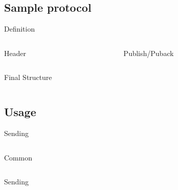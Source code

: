\documentclass{beamer}
\begin{document}
\subsection{Sample protocol}

\begin{frame}{Definition}

  \begin{columns}
      \begin{column}{0.5\textwidth}
        \begin{block}{Header}
          
        \end{block}        
      \end{column}
      \pause
      \begin{column}{0.5\textwidth}
        \begin{block}{Publish/Puback}
          
        \end{block}
      \end{column}
  \end{columns}
  \pause
  \begin{columns}
      \begin{column}{0.3333\textwidth}
        \begin{block}{Final Structure}
          
        \end{block}
      \end{column}
  \end{columns}
\end{frame}

\subsection{Usage}

\begin{frame}{Sending}
    {
      \begin{columns}
         \begin{column}{1.0\textwidth}
               \begin{block}{Common}
                  
               \end{block}
         \end{column}
      \end{columns}
   }
    {
      \begin{columns}   
         \begin{column}{1.0\textwidth}
            \begin{block}{Sending}
               
            \end{block}
         \end{column} 
      \end{columns}   
   }  
\end{frame}
\end{document}
